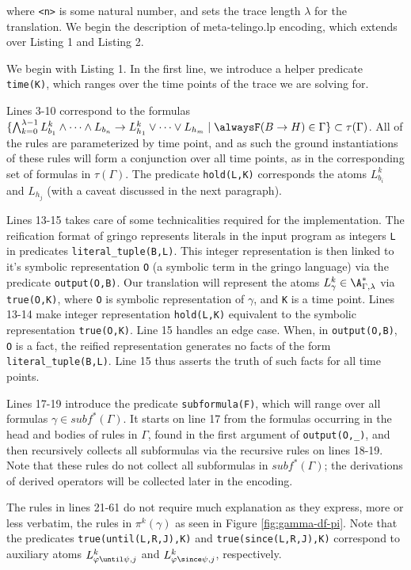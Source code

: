 where \verb|<n>| is some natural number, and sets the trace length
$\lambda$ for the translation. We begin the description of
meta-telingo.lp encoding, which extends over Listing 1 and Listing 2.

We begin with Listing 1. In the first line, we introduce a helper
predicate \verb|time(K)|, which ranges over the time points of the trace we
are solving for. 

Lines 3-10 correspond to the formulas
$\{ \bigwedge_{k=0}^{\lambda-1} L_{b_1}^k \land \dots \land L_{b_n}
\rightarrow L_{h_1}^k \lor \dots \lor L_{h_m} \mid \tempruleshort \in
\Gamma \} \subset \tau(\Gamma)$. All of the rules are parameterized by
time point, and as such the ground instantiations of these rules will
form a conjunction over all time points, as in the corresponding set
of formulas in $\tau(\Gamma)$. The predicate \verb|hold(L,K)|
corresponds the atoms $L_{b_i}^k$ and $L_{h_j}$ (with a caveat
discussed in the next paragraph).

Lines 13-15 takes care of some technicalities required for the
implementation. The reification format of gringo represents literals
in the input program as integers \verb|L| in predicates
\verb|literal_tuple(B,L)|. This integer representation is then linked
to it's symbolic representation \verb|O| (a symbolic term in the
gringo language) via the predicate \verb|output(O,B)|. Our translation
will represent the atoms $L_\gamma^k \in \A_{\Gamma,\lambda}^*$ via
\verb|true(O,K)|, where \verb|O| is symbolic representation of
$\gamma$, and \verb|K| is a time point. Lines 13-14 make integer
representation \verb|hold(L,K)| equivalent to the symbolic
representation \verb|true(O,K)|. Line 15 handles an edge case. When,
in \verb|output(O,B)|, \verb|O| is a fact, the reified representation
generates no facts of the form \verb|literal_tuple(B,L)|. Line 15 thus
asserts the truth of such facts for all time points.

Lines 17-19 introduce the predicate \verb|subformula(F)|, which will
range over all formulas $\gamma \in subf^*(\Gamma)$. It starts on line
17 from the formulas occurring in the head and bodies of rules in
$\Gamma$, found in the first argument of \verb|output(O,_)|, and then
recursively collects all subformulas via the recursive rules on lines
18-19. Note that these rules do not collect all subformulas in
$subf^*(\Gamma)$; the derivations of derived operators will be
collected later in the encoding.

The rules in lines 21-61 do not require much explanation as they
express, more or less verbatim, the rules in $\pi^k(\gamma)$ as seen
in Figure \ref{fig:gamma-df-pi}. Note that the predicates
\verb|true(until(L,R,J),K)| and \verb|true(since(L,R,J),K)| correspond
to auxiliary atoms $L^k_{\varphi \until \psi,j}$ and
$L^k_{\varphi \since \psi,j}$, respectively.

